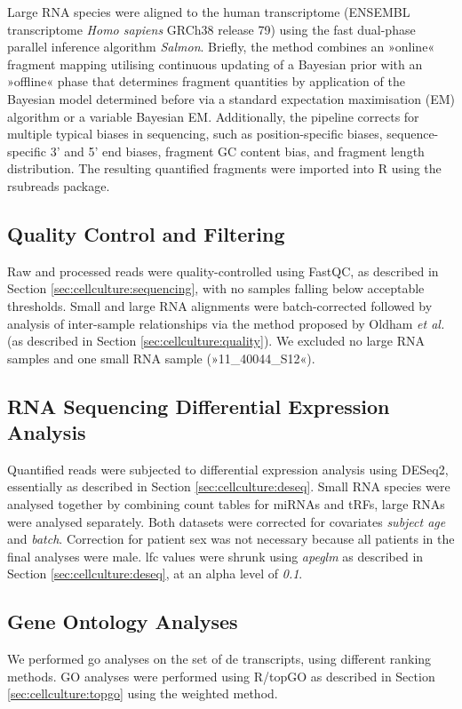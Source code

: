 \begin{method}
Large RNA species were aligned to the human transcriptome (ENSEMBL transcriptome \emph{Homo sapiens} GRCh38 release 79) using the fast dual-phase parallel inference algorithm \emph{Salmon}.\cite{Patro2017} Briefly, the method combines an »online« fragment mapping utilising continuous updating of a Bayesian prior with an »offline« phase that determines fragment quantities by application of the Bayesian model determined before via a standard expectation maximisation (EM) algorithm or a variable Bayesian EM. Additionally, the pipeline corrects for multiple typical biases in sequencing, such as position-specific biases, sequence-specific 3' and 5' end biases, fragment GC content bias, and fragment length distribution. The resulting quantified fragments were imported into R using the rsubreads package.\cite{Liao2019}

\subsection{Quality Control and Filtering}
Raw and processed reads were quality-controlled using FastQC, as described in Section \ref{sec:cellculture:sequencing}, with no samples falling below acceptable thresholds. Small and large RNA alignments were batch-corrected followed by analysis of inter-sample relationships via the method proposed by Oldham \emph{et al.}\cite{Oldham2012} (as described in Section \ref{sec:cellculture:quality}). We excluded no large RNA samples and one small RNA sample (»11\_40044\_S12«).

\subsection{RNA Sequencing Differential Expression Analysis}
Quantified reads were subjected to differential expression analysis using DESeq2, essentially as described in Section \ref{sec:cellculture:deseq}. Small RNA species were analysed together by combining count tables for miRNAs and tRFs, large RNAs were analysed separately. Both datasets were corrected for covariates \emph{subject age} and \emph{batch}. Correction for patient sex was not necessary because all patients in the final analyses were male. \ac{lfc} values were shrunk using \emph{apeglm} as described in Section \ref{sec:cellculture:deseq}, at an alpha level of \emph{0.1}.

\subsection{Gene Ontology Analyses}
We performed \ac{go} analyses on the set of \ac{de} transcripts, using different ranking methods. GO analyses were performed using R/topGO as described in Section \ref{sec:cellculture:topgo} using the weighted method.


\end{method}

